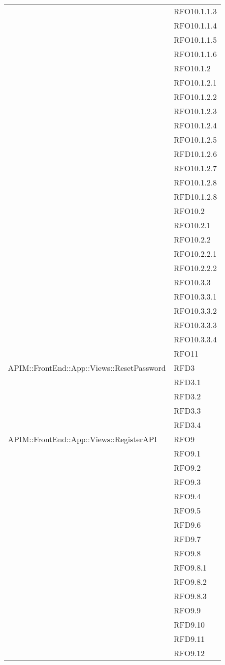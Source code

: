 \begin{longtable}{ p{12cm} | p{4cm} }
	& RFO10.1.1.3 \\
	& RFO10.1.1.4 \\
	& RFO10.1.1.5 \\
	& RFO10.1.1.6 \\
	& RFO10.1.2 \\
	& RFO10.1.2.1 \\
	& RFO10.1.2.2 \\
	& RFO10.1.2.3 \\
	& RFO10.1.2.4 \\
	& RFO10.1.2.5 \\
	& RFD10.1.2.6 \\
	& RFO10.1.2.7 \\
	& RFO10.1.2.8 \\
	& RFD10.1.2.8 \\
	& RFO10.2 \\
	& RFO10.2.1 \\
	& RFO10.2.2 \\
	& RFO10.2.2.1 \\
	& RFO10.2.2.2 \\
	& RFO10.3.3 \\
	& RFO10.3.3.1 \\
	& RFO10.3.3.2 \\
	& RFO10.3.3.3 \\
	& RFO10.3.3.4 \\
	& RFO11 \\
	\hline
	APIM::FrontEnd::App::Views::ResetPassword
	& RFD3 \\
	& RFD3.1 \\
	& RFD3.2 \\
	& RFD3.3 \\
	& RFD3.4 \\
	\hline
	APIM::FrontEnd::App::Views::RegisterAPI
	& RFO9 \\
	& RFO9.1 \\
	& RFO9.2 \\
	& RFO9.3 \\
	& RFO9.4 \\
	& RFO9.5 \\
	& RFD9.6 \\
	& RFD9.7 \\
	& RFO9.8 \\
	& RFO9.8.1 \\
	& RFO9.8.2 \\
	& RFO9.8.3 \\
	& RFO9.9 \\
	& RFD9.10 \\
	& RFD9.11 \\
	& RFO9.12 \\

\end{longtable}
